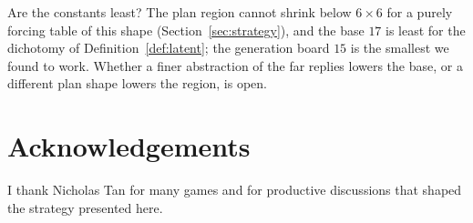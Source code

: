 \documentclass[11pt]{amsart}
\theoremstyle{definition}
\theoremstyle{remark}
\begin{document}
Are the constants least? The plan region cannot shrink below
$6 \times 6$ for a purely forcing table of this shape
(Section~\ref{sec:strategy}), and the base $17$ is least for the
dichotomy of Definition~\ref{def:latent}; the generation board $15$
is the smallest we found to work. Whether a finer abstraction of the
far replies lowers the base, or a different plan shape lowers the
region, is open.

\section*{Acknowledgements}

I thank Nicholas Tan for many games and for productive discussions
that shaped the strategy presented here.



\end{document}
